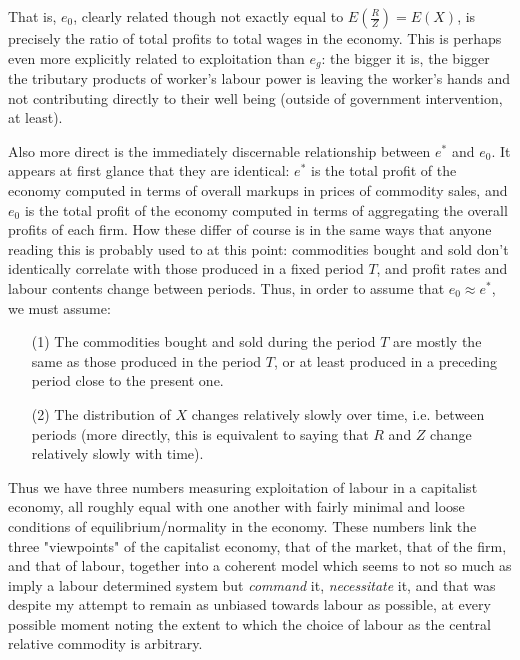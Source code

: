 That is, $e_0$, clearly related though not exactly equal to $E\left( \frac{R}{Z} \right) = E(X)$, is precisely the ratio of total profits to total wages in the economy. This is perhaps even more explicitly related to exploitation than $e_g$: the bigger it is, the bigger the tributary products of worker's labour power is leaving the worker's hands and not contributing directly to their well being (outside of government intervention, at least). \par 
Also more direct is the immediately discernable relationship between $e^*$ and $e_0$. It appears at first glance that they are identical: $e^*$ is the total profit of the economy computed in terms of overall markups in prices of commodity sales, and $e_0$ is the total profit of the economy computed in terms of aggregating the overall profits of each firm. How these differ of course is in the same ways that anyone reading this is probably used to at this point: commodities bought and sold don't identically correlate with those produced in a fixed period $T$, and profit rates and labour contents change between periods. Thus, in order to assume that $e_0 \approx e^*$, we must assume:
\begin{itemize}
	\item[(1)] The commodities bought and sold during the period $T$ are mostly the same as those produced in the period $T$, or at least produced in a preceding period close to the present one.
	\item[(2)] The distribution of $X$ changes relatively slowly over time, i.e. between periods (more directly, this is equivalent to saying that $R$ and $Z$ change relatively slowly with time).
\end{itemize}
Thus we have three numbers measuring exploitation of labour in a capitalist economy, all roughly equal with one another with fairly minimal and loose conditions of equilibrium/normality in the economy. These numbers link the three "viewpoints" of the capitalist economy, that of the market, that of the firm, and that of labour, together into a coherent model which seems to not so much as imply a labour determined system but \textit{command} it, \textit{necessitate} it, and that was despite my attempt to remain as unbiased towards labour as possible, at every possible moment noting the extent to which the choice of labour as the central relative commodity is arbitrary. \par 
